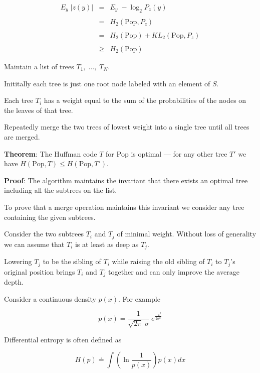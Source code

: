 {\begin{eqnarray*}
E_y\;|z(y)| & = & E_y\; -\log_2 P_z(y) \\
\\
 & = & H_2(\mathrm{Pop},P_z) \\
 \\
 &= & H_2(\mathrm{Pop}) + KL_2(\mathrm{Pop},P_z) \\
 \\
 &\geq & H_2(\mathrm{Pop})
\end{eqnarray*}
 

Maintain a list of trees $T_1,\;\dots,\;T_N$.

\vfill
Inititally each tree is just one root node labeled with an element of $S$.

\vfill
Each tree $T_i$ has a weight equal to the sum of the probabilities of the nodes on the leaves of that tree.

\vfill
Repeatedly merge the two trees of lowest weight into a single tree until all trees are merged.


{\bf Theorem}: The Huffman code $T$ for $\mathrm{Pop}$ is optimal --- for any other tree $T'$ we have $H(\mathrm{Pop},T) \leq H(\mathrm{Pop},T')$.

\vfill
{\bf Proof}: The algorithm maintains the invariant that there exists an optimal tree including
all the subtrees on the list.

\vfill
To prove that a merge operation maintains this invariant we consider any tree containing the given subtrees.

\vfill
Consider the two subtrees $T_i$ and $T_j$ of minimal weight.  Without loss of generality we can assume that $T_i$ is at least as deep as $T_j$.

\vfill
Lowering $T_j$ to be the sibling of $T_i$ while raising the old sibling of $T_i$ to $T_j$'s original position
brings $T_i$ and $T_j$ together and can only improve the average depth.


Consider a continuous density $p(x)$.  For example

\vfill
$$p(x) = \frac{1}{\sqrt{2\pi}\; \sigma}\; e^{\frac{-x^2}{2\sigma^2}}$$

\vfill
Differential entropy is often defined as

\vfill
$$H(p) \doteq \int \left(\ln \frac{1}{p(x)}\right) p(x) dx$$


}
